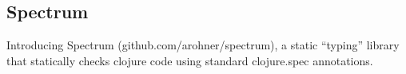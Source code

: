 
\subsection{Spectrum}
Introducing Spectrum (github.com/arohner/spectrum), a static “typing”
library that statically checks clojure code using standard clojure.spec
annotations.

